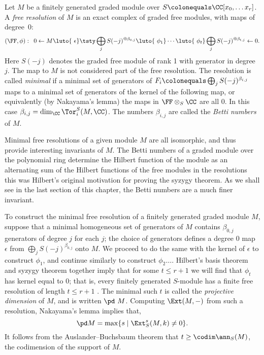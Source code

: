 Let $M$ be a finitely generated graded module over $S \colonequals
\CC[x_0, \dots x_r]$. A \emph{free resolution} of $M$ is an
%
exact complex
%
of graded free modules, with maps of degree~0:
$$
\let\quad\enspace
(\FF, \phi):\quad 0\leftarrow M \luto{\ \epsilon}
\tsty\bigoplus_jS(-j)^{@\beta_{0,j}}
\luto{\ \phi_1}\cdots
\luto{\ \phi_t}\bigoplus_jS(-j)^{@\beta_{t,j}}\leftarrow 0.
$$
Here $S(-j)$ denotes the graded free module of rank 1 with generator in
degree~$j$.
The map to $M$ is not considered part of the free resolution. The
resolution is called \emph{minimal} if a minimal set of generators of $F_i
\index{minimal free resolution}%
\index{free resolution!minimal}%
\colonequals  \bigoplus_jS(-j)^{\beta_{i,j}}$ maps to a minimal set of
generators of the kernel of the following map,
or equivalently (by Nakayama's lemma) the maps in $\FF\otimes_S \CC$
%
are all 0. In this case $\beta_{i,j} = \dim_{\CC}\Tor_{i}^{S}(M, \CC)$. 
%
The numbers $\beta_{i,j}$ are called the \emph{Betti numbers}
%
of $M$. 

Minimal free resolutions of a given module $M$ are all isomorphic, and thus provide
interesting invariants of $M$.
The Betti numbers of a graded module over the polynomial ring determine
the Hilbert function of the module as an alternating sum of the Hilbert functions of
the free modules in the resolutions \emdash this was Hilbert's original motivation
for proving the  syzygy  theorem. As we shall see in the last section of this chapter,
%
%
%
%
the Betti numbers are a much finer invariant.


To construct the minimal free resolution of a finitely generated graded module $M$, suppose that a minimal homogeneous set of generators
of $M$
contains $\beta_{0,j}$ generators of degree $j$ for each $j$; the choice of generators
defines a degree 0 map $\epsilon$
from
$
\bigoplus_jS(-j)^{\beta_{0,j}}
$
onto $M$. We proceed to do the same with the kernel of $\epsilon$ to construct $\phi_{1}$, and continue similarly to construct $\phi_{2}\dots$.
Hilbert's basis theorem
%
and
syzygy theorem
%
together imply that 
for some $t\leq r+1$ we will find that $\phi_t$ has
kernel equal to 0; that is,
every finitely
generated $S$-module has a finite free resolution
of length $t\leq r+1$
\cite[Corollary 19.7]{Eisenbud1995}.
The minimal such $t$ is called the \emph{projective dimension} of $M$,
and is
written $\pd\ M$.
%
%
Computing $\Ext(M,-)$ from such a resolution, Nakayama's lemma implies that,
$$
\pd M = \max\{s \mid \Ext_S^s(M,k) \neq 0 \}.
$$
It follows from the Auslander--Buchsbaum
%
theorem \cite[Theorem 19.9]{Eisenbud1995} that $t \geq \codim \ann_S(M)$,
the codimension of the support of $M$.

